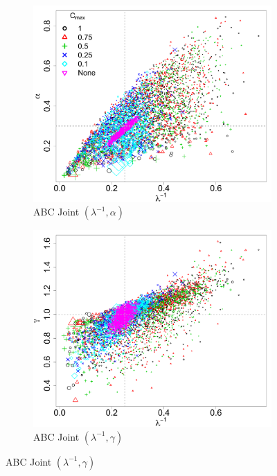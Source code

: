 \documentclass[ejs]{imsart}
\numberwithin{equation}{section}
\theoremstyle{plain}
\begin{document}
\begin{figure}[htbp]
   \centering
\begin{subfigure}{0.32\textwidth}
\centering
\includegraphics[width = \textwidth]{figures/joint_k_alpha_obs.pdf} 
\caption{ABC Joint $(\lambda^{-1}, \alpha)$}\label{subfig:joint_alpha_k_obs}
\end{subfigure}
\begin{subfigure}{0.32\textwidth}
\centering
\includegraphics[width = \textwidth]{figures/joint_k_gamma_obs.pdf} 
\caption{ABC Joint $(\lambda^{-1}, \gamma)$}\label{subfig:joint_gamma_k_obs}

\end{subfigure}
\end{figure}
\end{document}
